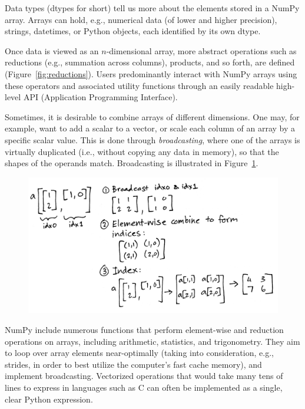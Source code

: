 Data types (dtypes for short) tell us more about the elements stored in a NumPy
array.
Arrays can hold, e.g., numerical data (of lower and higher precision), strings,
datetimes, or Python objects, each identified by its own dtype.

Once data is viewed as an $n$-dimensional array, more abstract operations such
as reductions (e.g., summation across columns), products, and so forth, are
defined (Figure~\ref{fig:reductions}).
Users predominantly interact with NumPy arrays using these operators and
associated utility functions through an easily readable high-level API
(Application Programming Interface).

Sometimes, it is desirable to combine arrays of different dimensions.
One may, for example, want to add a scalar to a vector, or scale each column of
an array by a specific scalar value.
This is done through {\em broadcasting}, where one of the arrays is virtually
duplicated (i.e., without copying any data in memory), so that the shapes of
the operands match.
Broadcasting is illustrated in Figure~\ref{fig:broadcasting}.

\begin{figure}
  \centering
  \includegraphics[width=\linewidth]{static/sketches/fancy-indexing}
  \caption{
   }
  \label{fig:broadcasting}
\end{figure}

NumPy include numerous functions that perform element-wise and reduction
operations on arrays, including arithmetic, statistics, and trigonometry.
They aim to loop over array elements near-optimally (taking into consideration,
e.g., strides, in order to best utilize the computer's fast cache memory), and
implement broadcasting.
Vectorized operations that would take many tens of lines to express in
languages such as C can often be implemented as a single, clear Python
expression.

